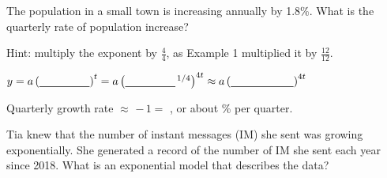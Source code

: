 The population in a small town is increasing annually by 1.8\%. What is the quarterly rate of population increase?

Hint: multiply the exponent by $\frac44$, as Example 1 multiplied it by $\frac{12}{12}$.

\vspace{2pt}
$y=a\left(\blank[1.6cm]\right)^{t}=a\left(\blank[1.6cm]^{\,1/4}\right)^{4t}\approx a\left(\blank[2cm]\right)^{4t}$

Quarterly growth rate $\approx$ \blank[2cm] $-\,1=$ \blank[2cm], or about \blank[1.6cm]\% per quarter.\lines[2]

Tia knew that the number of instant messages (IM) she sent was growing exponentially. She generated a record of the number of IM she sent each year since 2018. What is an exponential model that describes the data?

